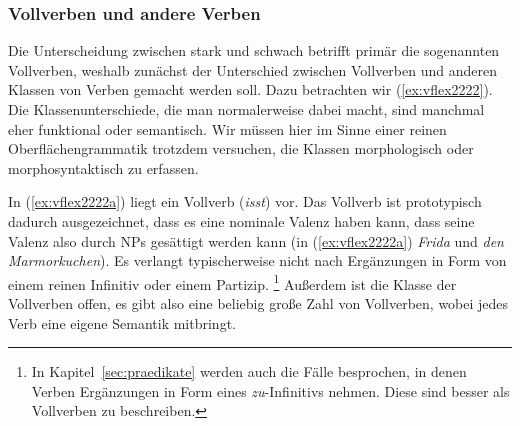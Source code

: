\subsubsection{Vollverben und andere Verben}

\label{sec:vollverbenundhilfsverben}


Die Unterscheidung zwischen stark und schwach betrifft primär die sogenannten Vollverben, weshalb zunächst der Unterschied zwischen Vollverben und anderen Klassen von Verben gemacht werden soll.
Dazu betrachten wir (\ref{ex:vflex2222}).
Die Klassenunterschiede, die man normalerweise dabei macht, sind manchmal eher funktional oder semantisch.
Wir müssen hier im Sinne einer reinen Oberflächengrammatik trotzdem versuchen, die Klassen morphologisch oder morphosyntaktisch zu erfassen.

\begin{exe}
  \ex\label{ex:vflex2222}
  \begin{xlist}
  \end{xlist}
\end{exe}

In (\ref{ex:vflex2222a}) liegt ein Vollverb (\textit{isst}) vor.
Das Vollverb ist prototypisch dadurch ausgezeichnet, dass es eine nominale Valenz haben kann, dass seine Valenz also durch NPs gesättigt werden kann (in (\ref{ex:vflex2222a}) \textit{Frida} und \textit{den Marmorkuchen}).
Es verlangt typischerweise nicht nach Ergänzungen in Form von einem reinen Infinitiv oder einem Partizip.%
\footnote{In Kapitel~\ref{sec:praedikate} werden auch die Fälle besprochen, in denen Verben Ergänzungen in Form eines \textit{zu}-Infinitivs nehmen.
Diese sind besser als Vollverben zu beschreiben.}
Außerdem ist die Klasse der Vollverben offen, es gibt also eine beliebig große Zahl von Vollverben, wobei jedes Verb eine eigene Semantik mitbringt.



